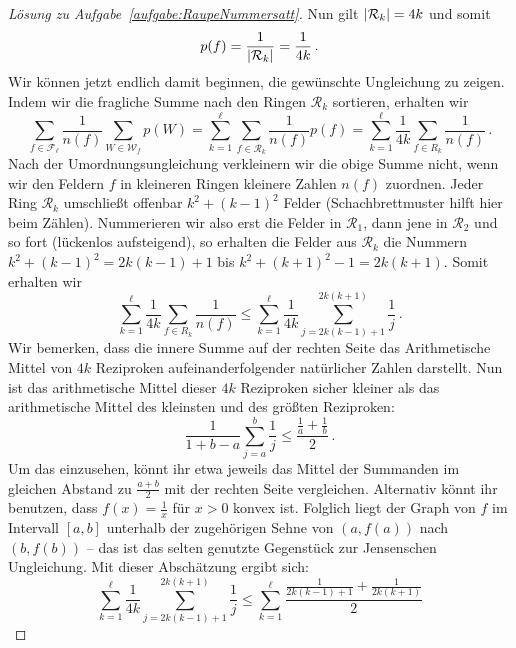 \begin{proof}[Lösung zu Aufgabe~\ref{aufgabe:RaupeNummersatt}]
	Nun gilt $\lvert\mathcal R_k\rvert=4k$ und somit
	\begin{equation*}
		p(f)=\frac{1}{\lvert\mathcal R_k\rvert}=\frac{1}{4k}\,.
	\end{equation*}
	Wir können jetzt endlich damit beginnen, die gewünschte Ungleichung zu zeigen. Indem wir die fragliche Summe nach den Ringen $\mathcal R_k$ sortieren, erhalten wir
	\begin{equation*}
		\sum_{f\in \mathcal F_\ell}\frac{1}{n(f)}\sum_{W\in \mathcal W_f}p(W)=\sum_{k=1}^\ell\sum_{f\in \mathcal R_k}\frac{1}{n(f)}p(f)=\sum_{k=1}^\ell\frac{1}{4k}\sum_{f\in R_k}\frac{1}{n(f)}\,.
	\end{equation*}
	Nach der Umordnungsungleichung verkleinern wir die obige Summe nicht,
	wenn wir den Feldern $f$ in kleineren Ringen kleinere Zahlen $n(f)$ zuordnen. Jeder Ring $\mathcal R_k$ umschließt offenbar $k^2+(k-1)^2$ Felder
	(Schachbrettmuster hilft hier beim Zählen). Nummerieren wir also erst die Felder in $\mathcal R_1$, dann jene in $\mathcal R_2$ und so fort (lückenlos aufsteigend), so erhalten die Felder aus
	$\mathcal R_k$ die Nummern $k^2+(k-1)^2=2k(k-1)+1$ bis $k^2+(k+1)^2-1=2k(k+1)$. Somit erhalten wir
	\begin{equation*}
		\sum_{k=1}^\ell\frac{1}{4k}\sum_{f\in R_k}\frac{1}{n(f)}\leqslant
		\sum_{k=1}^\ell\frac{1}{4k}\sum_{j=2k(k-1)+1}^{2k(k+1)}\frac{1}{j}\,.
	\end{equation*}
	Wir bemerken, dass die innere Summe auf der rechten Seite das Arithmetische Mittel von $4k$ Reziproken aufeinanderfolgender natürlicher Zahlen darstellt. Nun ist das arithmetische Mittel dieser $4k$ Reziproken sicher kleiner als das arithmetische Mittel des kleinsten und des größten Reziproken:
	\begin{equation*}
		\frac{1}{1+b-a}\sum_{j=a}^b \frac{1}{j}\leqslant\frac{\frac{1}{a}+\frac{1}{b}}{2}\,.
	\end{equation*}
	Um das einzusehen, könnt ihr etwa jeweils das Mittel der Summanden im gleichen Abstand zu $\frac{a+b}{2}$ mit der rechten Seite vergleichen. Alternativ könnt ihr benutzen, dass $f(x)=\frac{1}{x}$ für $x>0$ konvex ist. Folglich liegt der Graph von $f$ im Intervall $[a,b]$ unterhalb der zugehörigen Sehne von $(a,f(a))$ nach $(b,f(b))$ -- das ist das selten genutzte Gegenstück zur Jensenschen Ungleichung. Mit dieser Abschätzung ergibt sich:
	\begin{equation*}
		\sum_{k=1}^\ell\frac{1}{4k}\sum_{j=2k(k-1)+1}^{2k(k+1)}\frac{1}{j}\leqslant \sum_{k=1}^\ell\frac{\frac{1}{2k(k-1)+1}+\frac{1}{2k(k+1)}}{2}
	\end{equation*}

\end{proof}
